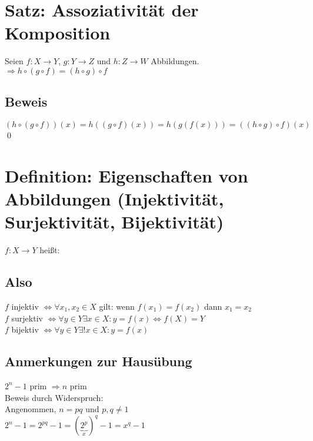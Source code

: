 \section{Satz: Assoziativität der Komposition}\label{4.4}
Seien $f: X \to Y$, $g: Y \to Z$ und $h: Z \to W$ Abbildungen.\\
$\Rightarrow h \circ (g \circ f) = (h \circ g) \circ f$

\subsection*{Beweis}
$(h \circ (g \circ f))(x)=h((g \circ f)(x))=h(g(f(x)))=((h \circ g) \circ f)(x)$ \qed

\section{Definition: Eigenschaften von Abbildungen (Injektivität, Surjektivität, Bijektivität)}\label{4.5}
$f: X \to Y$ heißt:

\subsection*{Also}
$f$ injektiv $\Leftrightarrow \forall x_1, x_2 \in X$ gilt: wenn $f(x_1)=f(x_2)$ dann $x_1=x_2$\\
$f$ surjektiv $\Leftrightarrow \forall y \in Y \exists x \in X: y=f(x) \Leftrightarrow f(X)=Y$\\
$f$ bijektiv $\Leftrightarrow \forall y \in Y \exists! x \in X: y=f(x)$

\subsection*{Anmerkungen zur Hausübung}
$2^n-1$ prim $\Rightarrow n$ prim\\
Beweis durch Widerspruch:\\
Angenommen, $n=pq$ und $p,q \neq 1$\\
$2^n-1=2^{pq}-1=(\underbrace{2^p}_{x})^q -1=x^q -1$

